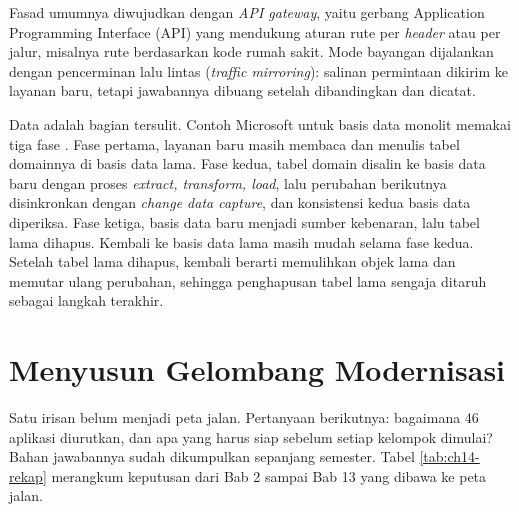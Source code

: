 \begin{pendalaman}[title={Pendalaman Teknis (opsional): Mode Bayangan dan Pemindahan Data}]
  Fasad umumnya diwujudkan dengan \textit{API gateway}, yaitu gerbang Application Programming
  Interface (API) yang mendukung aturan rute per \textit{header} atau per jalur, misalnya rute
  berdasarkan kode rumah sakit. Mode bayangan
  dijalankan dengan pencerminan lalu lintas (\textit{traffic mirroring}): salinan permintaan
  dikirim ke layanan baru, tetapi jawabannya dibuang setelah dibandingkan dan dicatat.

  Data adalah bagian tersulit. Contoh Microsoft untuk basis data monolit memakai tiga fase
  \cite{c14-azure-strangler}. Fase pertama, layanan baru masih membaca dan menulis tabel domainnya di
  basis data lama. Fase kedua, tabel domain disalin ke basis data baru dengan proses
  \textit{extract, transform, load}, lalu perubahan berikutnya disinkronkan dengan \textit{change
  data capture}, dan konsistensi kedua basis data diperiksa. Fase ketiga, basis data baru menjadi
  sumber kebenaran, lalu tabel lama dihapus. Kembali ke basis data lama masih mudah selama fase
  kedua. Setelah tabel lama dihapus, kembali berarti memulihkan objek lama dan memutar ulang
  perubahan, sehingga penghapusan tabel lama sengaja ditaruh sebagai langkah terakhir.
\end{pendalaman}

\section{Menyusun Gelombang Modernisasi}
\label{sec:ch14-gelombang}

Satu irisan belum menjadi peta jalan. Pertanyaan berikutnya: bagaimana 46 aplikasi diurutkan, dan
apa yang harus siap sebelum setiap kelompok dimulai? Bahan jawabannya sudah dikumpulkan sepanjang
semester. Tabel \ref{tab:ch14-rekap} merangkum keputusan dari Bab 2 sampai Bab 13 yang dibawa ke peta
jalan.

